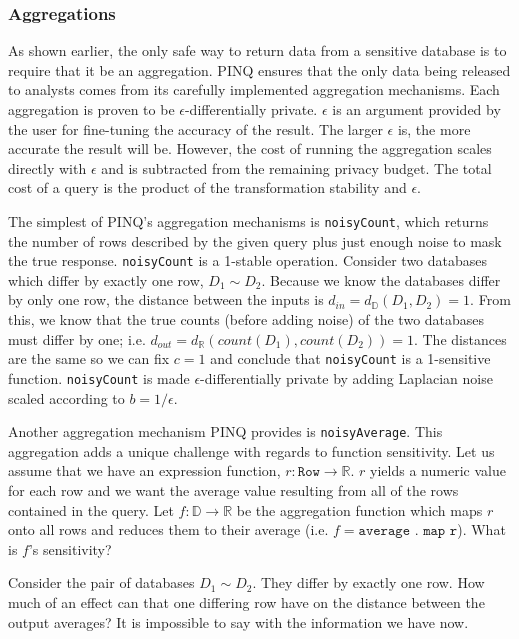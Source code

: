 \documentclass[12pt]{article}
\begin{document}
\subsubsection{Aggregations}

As shown earlier, the only safe way to return data from a sensitive database is to require that it be an aggregation.
PINQ ensures that the only data being released to analysts comes from its carefully implemented aggregation mechanisms.
Each aggregation is proven to be $\epsilon$-differentially private.
$\epsilon$ is an argument provided by the user for fine-tuning the accuracy of the result.
The larger $\epsilon$ is, the more accurate the result will be.
However, the cost of running the aggregation scales directly with $\epsilon$ and is subtracted from the remaining privacy budget.
The total cost of a query is the product of the transformation stability and $\epsilon$.

The simplest of PINQ's aggregation mechanisms is \texttt{noisyCount}, which returns the number of rows described by the given query plus just enough noise to mask the true response.
\texttt{noisyCount} is a 1-stable operation.
Consider two databases which differ by exactly one row, $D_1 \sim D_2$.
Because we know the databases differ by only one row, the distance between the inputs is $d_{in} = d_{\mathbb D}(D_1,D_2)=1$.
From this, we know that the true counts (before adding noise) of the two databases must differ by one; i.e. $d_{out} = d_{\mathbb R}(count(D_1),count(D_2))=1$.
The distances are the same so we can fix $c=1$ and conclude that \texttt{noisyCount} is a 1-sensitive function.
\texttt{noisyCount} is made $\epsilon$-differentially private by adding Laplacian noise scaled according to $b=1/\epsilon$.

Another aggregation mechanism PINQ provides is \texttt{noisyAverage}.
This aggregation adds a unique challenge with regards to function sensitivity.
Let us assume that we have an expression function, $r : \texttt{Row} \rightarrow \mathbb R$.
$r$ yields a numeric value for each row and we want the average value resulting from all of the rows contained in the query.
Let $f : \mathbb D \rightarrow \mathbb R$ be the aggregation function which maps $r$ onto all rows and reduces them to their average (i.e. $f = \texttt{average . map r}$).
What is $f$'s sensitivity?

Consider the pair of databases $D_1 \sim D_2$.
They differ by exactly one row.
How much of an effect can that one differing row have on the distance between the output averages?
It is impossible to say with the information we have now.
\end{document}
